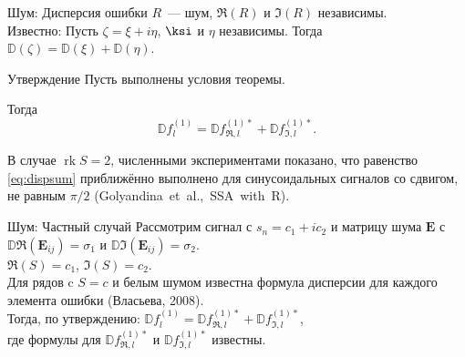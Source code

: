 \documentclass[ucs, notheorems, handout]{beamer}
\DeclareMathOperator{\rk}{rk}
\begin{document}
\begin{frame}{Шум: Дисперсия ошибки}
    $R$~--- шум, $\Re(R)$ и $\Im(R)$ независимы.\\
    \vspace{1em}
    \alert{Известно:} Пусть $\zeta = \xi + i\eta$, $\ksi$ и $\eta$ независимы. Тогда $\mathbb{D}(\zeta) = \mathbb{D}(\xi) + \mathbb{D}(\eta)$.
    \begin{block}{Утверждение}
        Пусть выполнены условия теоремы.
	
	Тогда
	\begin{equation} \label{eq:dispsum}
	\mathbb{D}f^{(1)}_l = \mathbb{D}f^{(1)*}_{\Re, l} + \mathbb{D}f^{(1)*}_{\Im, l}.	
	\end{equation}
    \end{block}
    
    В случае $\rk S = 2$, численными экспериментами показано, что равенство \eqref{eq:dispsum} приближённо выполнено для синусоидальных сигналов со сдвигом, не равным $\pi / 2$  (Golyandina~et~al.,~SSA~with~R).
\end{frame}

\begin{frame}{Шум: Частный случай}
    Рассмотрим сигнал с $s_n = c_1 + ic_2$ и матрицу шума $\mathbf{E}$ с  $\mathbb{D}\Re(\mathbf{E}_{ij}) = \sigma_1$ и $\mathbb{D}\Im(\mathbf{E}_{ij}) = \sigma_2$.\\
    \vspace{1em}
    $\Re(S) = c_1$, $\Im(S) = c_2$.\\
    \vspace{1em}
    Для рядов c $S = c$ и белым шумом известна формула дисперсии для каждого элемента ошибки (Власьева, 2008).\\
    \vspace{1em}
    Тогда, по утверждению: $\mathbb{D} f^{(1)}_l = \mathbb{D} f^{(1)*}_{\Re, l} + \mathbb{D} f^{(1)*}_{\Im, l}$,\\
    где формулы для $\mathbb{D} f^{(1)*}_{\Re, l}$ и $\mathbb{D} f^{(1)*}_{\Im, l}$ известны.
\end{frame}
\end{document}
